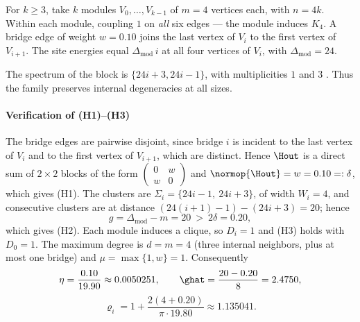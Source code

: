 \begin{exemplo}
\label{ex:cliques}
For $k\ge3$, take $k$ modules $V_0,\dots,V_{k-1}$ of $m=4$ vertices each, with
$n=4k$. Within each module, coupling $1$ on \emph{all} six edges ---
the module induces $K_4$. A bridge edge of weight $w=0.10$ joins the last vertex of
$V_i$ to the first vertex of $V_{i+1}$. The site energies equal $\Delta_{\mathrm{mod}}\,i$
at all four vertices of $V_i$, with $\Delta_{\mathrm{mod}}=24$.

The spectrum of the block is $\{24i+3,24i-1\}$, with multiplicities $1$ and $3$
\cite{brouwer2012}. Thus the family preserves internal degeneracies
at all sizes.

\paragraph{Verification of (H1)--(H3)}
The bridge edges are pairwise disjoint, since bridge $i$ is incident to the last
vertex of $V_i$ and to the first vertex of $V_{i+1}$, which are distinct. Hence $\Hout$ is a direct
sum of $2\times2$ blocks of the form
$\left(\begin{smallmatrix}0&w\\w&0\end{smallmatrix}\right)$ and
$\normop{\Hout}=w=0.10=:\delta$, which gives (H1). The clusters are
$\Sigma_i=\{24i-1,\ 24i+3\}$, of width $W_i=4$, and consecutive clusters are at distance
$(24(i+1)-1)-(24i+3)=20$; hence
\[
g=\Delta_{\mathrm{mod}}-m=20\ >\ 2\delta=0.20,
\]
which gives (H2). Each module induces a clique, so $D_i=1$ and (H3) holds with $D_0=1$.
The maximum degree is $d=m=4$ (three internal neighbors, plus at most one bridge) and
$\mu=\max\{1,w\}=1$. Consequently
\[
\eta=\frac{0.10}{19.90}\approx0.0050251,
\qquad
\ghat=\frac{20-0.20}{8}=2.4750,
\]
\[
\varrho_i=1+\frac{2(4+0.20)}{\pi\cdot19.80}\approx1.135041 .
\]


\end{exemplo}
